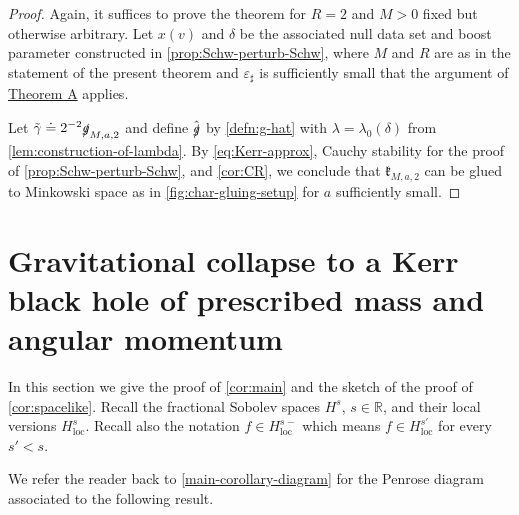 \documentclass[10pt]{article}
\numberwithin{equation}{section}
\theoremstyle{plain}
\theoremstyle{definition}
\renewcommand{\Bbb}{\mathbb}
\newcommand{\ve}{\varepsilon}
\begin{document}
\begin{proof}
Again, it suffices to prove the theorem for $R=2$ and $M>0$ fixed but otherwise arbitrary. Let $x(v)$ and $\delta$ be the associated null data set and boost parameter constructed in \cref{prop:Schw-perturb-Schw}, where $M$ and $R$ are as in the statement of the present theorem and $\ve_\sharp$ is sufficiently small that the argument of \hyperlink{thmA}{Theorem A} applies. 

Let $\tilde\gamma \doteq  2^{-2} \slashed g_{M,a,2}$ and define $\hat{\slashed g}$ by \eqref{defn:g-hat} with $\lambda=\lambda_0(\delta)$ from \cref{lem:construction-of-lambda}. By \eqref{eq:Kerr-approx}, Cauchy stability for the proof of \cref{prop:Schw-perturb-Schw}, and \cref{cor:CR}, we conclude that $\mathfrak k_{M,a,2}$ can be glued to Minkowski space as in \cref{fig:char-gluing-setup} for $a$ sufficiently small.
\end{proof}

\section{Gravitational collapse to a Kerr black hole of prescribed mass and angular momentum}\label{sec:proofs-of-corollaries}

In this section we give the proof of \cref{cor:main} and the sketch of the proof of \cref{cor:spacelike}. Recall the fractional Sobolev spaces $H^s$, $s\in\Bbb R$, and their local versions $H^s_\mathrm{loc}$. Recall also the notation $f\in H^{s-}_\mathrm{loc}$ which means $f\in H^{s'}_\mathrm{loc}$ for every $s'<s$. 

 We refer the reader back to \cref{main-corollary-diagram} for the Penrose diagram associated to the following result. 
\end{document}
